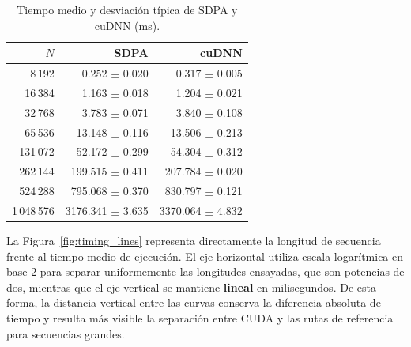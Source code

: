 \begin{table}[H]
\centering
\caption{Tiempo medio y desviación típica de SDPA y cuDNN (ms).}
\label{tab:timings_sdpa_cudnn}
\begin{tabular}{rrr}
\toprule
\textbf{\(N\)} & \textbf{SDPA} & \textbf{cuDNN} \\
\midrule
8\,192       & 0.252 $\pm$ 0.020 & 0.317 $\pm$ 0.005 \\
16\,384      & 1.163 $\pm$ 0.018 & 1.204 $\pm$ 0.021 \\
32\,768      & 3.783 $\pm$ 0.071 & 3.840 $\pm$ 0.108 \\
65\,536      & 13.148 $\pm$ 0.116 & 13.506 $\pm$ 0.213 \\
131\,072     & 52.172 $\pm$ 0.299 & 54.304 $\pm$ 0.312 \\
262\,144     & 199.515 $\pm$ 0.411 & 207.784 $\pm$ 0.020 \\
524\,288     & 795.068 $\pm$ 0.370 & 830.797 $\pm$ 0.121 \\
1\,048\,576 & 3176.341 $\pm$ 3.635 & 3370.064 $\pm$ 4.832 \\
\bottomrule
\end{tabular}
\end{table}

La Figura~\ref{fig:timing_lines} representa directamente la longitud de secuencia frente al tiempo medio de ejecución. El eje horizontal utiliza escala logarítmica en base 2 para separar uniformemente las longitudes ensayadas, que son potencias de dos, mientras que el eje vertical se mantiene \textbf{lineal} en milisegundos. De esta forma, la distancia vertical entre las curvas conserva la diferencia absoluta de tiempo y resulta más visible la separación entre CUDA y las rutas de referencia para secuencias grandes.

